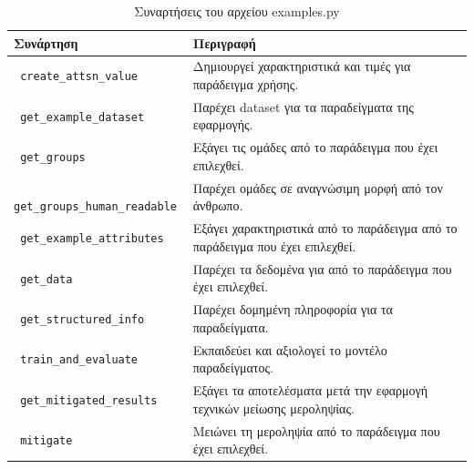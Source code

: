 \documentclass[12pt,twoside]{article}
\newcommand{\en}{\selectlanguage{english}}
\newcommand{\gr}{\selectlanguage{greek}}
\begin{document}
\begin{table}[H]
\centering
\caption{\gr Συναρτήσεις του αρχείου \en examples.py}
\begin{tabular}{|l|p{10cm}|}
\hline
\textbf{\gr Συνάρτηση} & \textbf{\gr Περιγραφή} \\ \hline
\texttt{ \en create\_attsn\_value} & \gr Δημιουργεί χαρακτηριστικά και τιμές για παράδειγμα χρήσης. \\ \hline
\texttt{ \en get\_example\_dataset} & \gr Παρέχει \en dataset \gr για τα παραδείγματα της εφαρμογής. \\ \hline
\texttt{ \en get\_groups} & \gr Εξάγει τις ομάδες από το παράδειγμα που έχει επιλεχθεί. \\ \hline
\texttt{ \en get\_groups\_human\_readable} & \gr Παρέχει ομάδες σε αναγνώσιμη μορφή από τον άνθρωπο. \\ \hline
\texttt{ \en get\_example\_attributes} & \gr Εξάγει χαρακτηριστικά από το παράδειγμα από το παράδειγμα που έχει επιλεχθεί. \\ \hline
\texttt{ \en get\_data} & \gr Παρέχει τα δεδομένα για από το παράδειγμα που έχει επιλεχθεί. \\ \hline
\texttt{ \en get\_structured\_info} & \gr Παρέχει δομημένη πληροφορία για τα παραδείγματα. \\ \hline
\texttt{ \en train\_and\_evaluate} & \gr Εκπαιδεύει και αξιολογεί το μοντέλο παραδείγματος. \\ \hline
\texttt{ \en get\_mitigated\_results} & \gr Εξάγει τα αποτελέσματα μετά την εφαρμογή τεχνικών μείωσης μεροληψίας. \\ \hline
\texttt{ \en mitigate} & \gr Μειώνει τη μεροληψία από το παράδειγμα που έχει επιλεχθεί. \\ \hline
\end{tabular}
\end{table}
\end{document}
